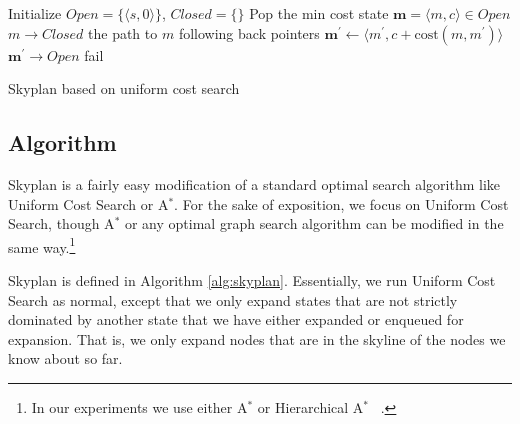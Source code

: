 \documentclass[letterpaper]{article}
\theoremstyle{plain} \newtheorem{theorem}{Theorem} \newtheorem{proposition}{Proposition} \newtheorem{lemma}{Lemma}
\theoremstyle{definition} \newtheorem{definition}{Definition} \newtheorem{conjecture}{Conjecture} \newtheorem*{example}{Example}
\theoremstyle{remark} \newtheorem*{remark}{Remark} \newtheorem*{note}{Note} \newtheorem{case}{Case}
\newcommand{\Astar}{A$^*$ }
\newcommand{\Astarpunct}{A$^*$}
\begin{document}
\begin{algorithm}[t!]
  \begin{algorithmic}[1]
    \State Initialize $\textit{Open}=\{\langle s,0\rangle\}$, $\textit{Closed}=\{\}$
    \State Pop the min cost state $\mathbf{m} = \langle m,c\rangle\in \textit{Open}$
    \State $m\rightarrow \textit{Closed}$
        \State \Return the path to $m$ following back pointers
      \EndIf
        \State $\mathbf{m^\prime} \gets \langle m^\prime,c+\mathrm{cost}(m,m^\prime)\rangle$
        \State $\mathbf{m^\prime} \rightarrow \textit{Open}$
        \EndFor
      \EndIf
    \EndWhile
    \State fail
  \EndProcedure
  \end{algorithmic}
\caption{Skyplan based on uniform cost search}
\label{alg:skyplan}
\end{algorithm}

\subsection{Algorithm}

Skyplan is a fairly easy modification of a standard
optimal search algorithm like Uniform Cost Search or \Astarpunct. For
the sake of exposition, we focus on Uniform Cost Search, though
\Astar or any optimal graph search algorithm can be modified in the
same way.\footnote{In our experiments we use either \Astar or
Hierarchical \Astar~\citep{holte1996hierarchical}.}

Skyplan is defined in Algorithm \ref{alg:skyplan}. Essentially, we
run Uniform Cost Search as normal, except that we only expand states
that are not strictly dominated by another state that we have either
expanded or enqueued for expansion. That is, we only expand nodes
that are in the skyline of the nodes we know about so far.

\end{document}
